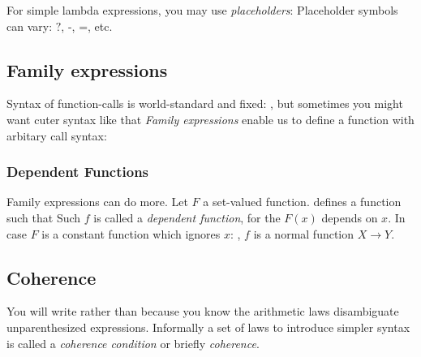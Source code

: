For simple lambda expressions, you may use \textit{placeholders}:
Placeholder symbols can vary: $\texttt{?}$, $\texttt{-}$, $\texttt{=}$, etc.


\subsection{Family expressions}

Syntax of function-calls is world-standard and fixed:
, but sometimes you might want cuter syntax like that
\textit{Family expressions} enable us to define a function with arbitary call syntax:

\subsubsection{Dependent Functions}

Family expressions can do more. Let $F$ a set-valued function.
defines a function
such that
Such $f$ is called a \textit{dependent function}, for the $F(x)$ depends on $x$. 
In case $F$ is a constant function which ignores $x$:
, $f$ is a normal function $X \to Y$. 


\subsection{Coherence}

You will write
rather than
because you know the arithmetic laws
disambiguate unparenthesized expressions.
Informally a set of laws to introduce simpler syntax is called a \textit{coherence condition} or briefly \textit{coherence}.

